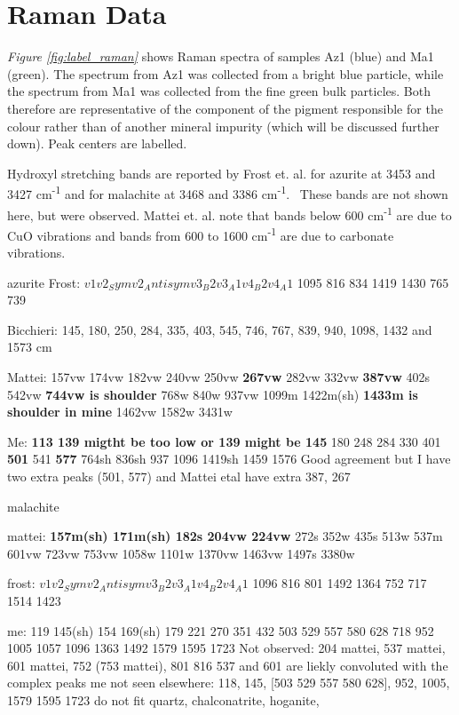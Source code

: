 \section[Raman Data]{Raman Data}
\label{section3.3}


\textit{Figure \ref{fig:label_raman}} shows Raman spectra of samples Az1 (blue) and Ma1 (green). The spectrum from Az1 was collected from a bright blue particle, while the spectrum from Ma1 was collected from the fine green bulk particles. Both therefore are representative of the component of the pigment responsible for the colour rather than of another mineral impurity (which will be discussed further down). Peak centers are labelled.

Hydroxyl stretching bands are reported by Frost et. al. for azurite at 3453 and 3427 cm\textsuperscript{-1} and for malachite at 3468 and 3386 cm\textsuperscript{-1}.~\autocite{Frost} These bands are not shown here, but were observed. Mattei et. al. note that bands below 600 cm\textsuperscript{-1} are due to CuO vibrations and bands from 600 to 1600 cm\textsuperscript{-1} are due to carbonate vibrations.


azurite
Frost: $v1    v2_Sym  v2_Antisym   v3_B2   v3_A1    v4_B2   v4_A1$
       1095   816       834        1419    1430     765     739

Bicchieri: 145, 180, 250, 284, 335, 403, 545, 746, 767, 839, 940, 1098, 1432 and 1573 cm

Mattei: 157vw 174vw 182vw 240vw 250vw \textbf{267vw} 282vw 332vw
\textbf{387vw} 402s 542vw \textbf{744vw is shoulder} 768w 840w 937vw 1099m
1422m(sh) \textbf{1433m is shoulder in mine} 1462vw 1582w 3431w

Me: \textbf{113 139 migtht be too low or 139 might be 145} 180 248 284 330 401 \textbf{501} 541 \textbf{577} 764sh 836sh  937 1096 1419sh 1459 1576
Good agreement but I have two extra peaks (501, 577) and Mattei etal have extra 387, 267


malachite

mattei: \textbf{157m(sh) 171m(sh) 182s 204vw 224vw} 272s 352w 435s 513w
537m 601vw 723vw 753vw 1058w 1101w 1370vw 1463vw
1497s 3380w

frost: $v1    v2_Sym  v2_Antisym   v3_B2   v3_A1    v4_B2   v4_A1$
      1096     816      801       1492     1364     752     717
                                  1514     1423

me: 119 145(sh) 154 169(sh) 179 221 270 351 432 503 529 557 580 628 718 952 1005 1057 1096 1363 1492 1579 1595 1723
Not observed: 204 mattei, 537 mattei, 601 mattei, 752 (753 mattei), 801 816
537 and 601 are liekly convoluted with the complex peaks
me not seen elsewhere: 118, 145, [503 529 557 580 628], 952, 1005, 1579 1595 1723
do not fit quartz, chalconatrite, hoganite, 





